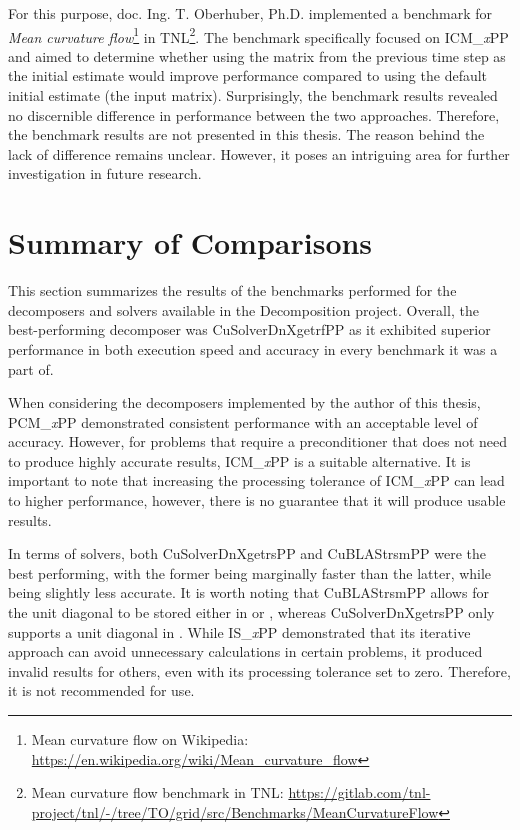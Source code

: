 For this purpose, doc. Ing. T. Oberhuber, Ph.D. implemented a benchmark for \textit{Mean curvature flow}\footnote{Mean curvature flow on Wikipedia: \url{https://en.wikipedia.org/wiki/Mean_curvature_flow}} in TNL\footnote{Mean curvature flow benchmark in TNL: \url{https://gitlab.com/tnl-project/tnl/-/tree/TO/grid/src/Benchmarks/MeanCurvatureFlow}}. The benchmark specifically focused on ICM\_\textit{x}PP and aimed to determine whether using the  matrix from the previous time step as the initial estimate would improve performance compared to using the default initial estimate (the input matrix). Surprisingly, the benchmark results revealed no discernible difference in performance between the two approaches. Therefore, the benchmark results are not presented in this thesis. The reason behind the lack of difference remains unclear. However, it poses an intriguing area for further investigation in future research.




\section{Summary of Comparisons}\label{Section:comparing-decomposers-and-solvers->summary-of-comparisons}
This section summarizes the results of the benchmarks performed for the decomposers and solvers available in the Decomposition project. Overall, the best-performing decomposer was CuSolverDnXgetrfPP as it exhibited superior performance in both execution speed and accuracy in every benchmark it was a part of.

When considering the decomposers implemented by the author of this thesis, PCM\_\textit{x}PP demonstrated consistent performance with an acceptable level of accuracy. However, for problems that require a preconditioner that does not need to produce highly accurate results, ICM\_\textit{x}PP is a suitable alternative. It is important to note that increasing the processing tolerance of ICM\_\textit{x}PP can lead to higher performance, however, there is no guarantee that it will produce usable results.

In terms of solvers, both CuSolverDnXgetrsPP and CuBLAStrsmPP were the best performing, with the former being marginally faster than the latter, while being slightly less accurate. It is worth noting that CuBLAStrsmPP allows for the unit diagonal to be stored either in  or , whereas CuSolverDnXgetrsPP only supports a unit diagonal in . While IS\_\textit{x}PP demonstrated that its iterative approach can avoid unnecessary calculations in certain problems, it produced invalid results for others, even with its processing tolerance set to zero. Therefore, it is not recommended for use.